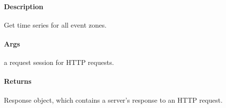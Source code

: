 \documentclass[letterpaper,10pt,english]{sphinxmanual}
\begin{document}
\begin{fulllineitems}
\label{\detokenize{gemini_lidar_hub_API:gemini_lidar_hub_API.get_lidar_hub_event_timeseries}}
\pysigstartsignatures
{}
\pysigstopsignatures

\paragraph{Description}
\label{\detokenize{gemini_lidar_hub_API:id20}}
\sphinxAtStartPar
Get time series for all event zones.


\paragraph{Args}
\label{\detokenize{gemini_lidar_hub_API:id21}}\begin{description}
\sphinxAtStartPar
a request session for HTTP requests.

\end{description}


\paragraph{Returns}
\label{\detokenize{gemini_lidar_hub_API:id22}}\begin{description}
\sphinxAtStartPar
Response object, which contains a server’s response to an HTTP request.

\end{description}

\end{fulllineitems}

\end{document}
